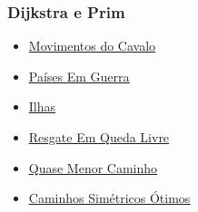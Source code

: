 \documentclass{beamer}
\begin{document}
	\begin{frame}
	\frametitle{Dijkstra e Prim}
	\begin{itemize}
	\item \textcolor{blue}{\underline{\href{https://www.urionlinejudge.com.br/judge/pt/problems/view/1100}{Movimentos do Cavalo}}}
	\item \textcolor{blue}{\underline{\href{https://www.urionlinejudge.com.br/judge/pt/problems/view/1148}{Países Em Guerra}}}
	\item \textcolor{blue}{\underline{\href{https://www.urionlinejudge.com.br/judge/pt/problems/view/2784}{Ilhas}}}
	\item \textcolor{blue}{\underline{\href{https://www.urionlinejudge.com.br/judge/pt/problems/view/1552}{Resgate Em Queda Livre}}}
	\item \textcolor{blue}{\underline{\href{https://www.urionlinejudge.com.br/judge/pt/problems/view/1391}{Quase Menor Caminho}}}
	\item \textcolor{blue}{\underline{\href{https://www.urionlinejudge.com.br/judge/pt/problems/view/1461}{Caminhos Simétricos Ótimos}}}
	\end{itemize}
	\end{frame}
\end{document}
